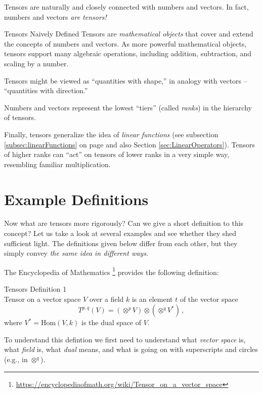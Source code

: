 Tensors are naturally and closely connected with numbers and
vectors. In fact, numbers and vectors \emph{are tensors!}

\begin{mybio}{Tensors Naively Defined}
Tensors are \emph{mathematical objects} that cover and extend the
concepts of numbers and vectors. As more powerful mathematical
objects, tensors support many algebraic operations, including
addition, subtraction, and scaling by a number.

Tensors might be viewed as ``quantities with shape,'' in
analogy with vectors -- ``quantities with direction.''

Numbers and vectors represent the lowest ``tiers'' (called
\emph{ranks}) in the hierarchy of tensors.

Finally, tensors generalize the idea of \emph{linear functions} (see
subsection \ref{subsec:linearFunctions} on page
\pageref{subsec:linearFunctions} and also Section
\ref{sec:LinearOperators}). Tensors of higher ranks can ``act'' on
tensors of lower ranks in a very simple way, resembling familiar
multiplication.
\end{mybio}

\section{Example Definitions}\label{sec:ExampleDefinitions}
Now what are tensors more rigorously? Can we give a short definition
to this concept?
Let us take a look at several examples and see whether they shed
sufficient light. The definitions given below differ from each other,
but they simply convey \emph{the same idea in different ways}.

The Encyclopedia of Mathematics
\footnote{\url{https://encyclopediaofmath.org/wiki/Tensor_on_a_vector_space}}
provides the following definition:

\begin{mydef}{Tensors Definition 1}\\
  \small
Tensor on a vector space $V$ over a field $k$ is an element $t$ of the
vector space
\begin{equation*}
	T^{p,q} (V) = (\otimes^p V)\otimes (\otimes^q V^*)\,,
\end{equation*}
where $V^*=\textrm{Hom}(V, k)$ is the dual space of $V$.
\label{tcb:tensorDefinition1}
\end{mydef}
To understand this defintion we first need to understand what
\emph{vector space} is, what \emph{field} is, what \emph{dual} means,
and what is going on with superscripts and circles (e.g., in
$\otimes^q$).


